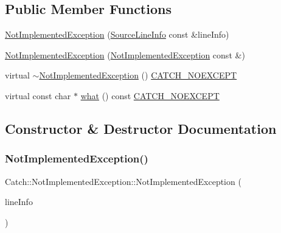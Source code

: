 \subsection*{Public Member Functions}
\begin{DoxyCompactItemize}
\item 
\hyperlink{class_catch_1_1_not_implemented_exception_ab4f0a5c39d8ffb72c664e2c07e180634}{Not\+Implemented\+Exception} (\hyperlink{struct_catch_1_1_source_line_info}{Source\+Line\+Info} const \&line\+Info)
\item 
\hyperlink{class_catch_1_1_not_implemented_exception_a508a7a833455da2d3c10ea1a9d45e982}{Not\+Implemented\+Exception} (\hyperlink{class_catch_1_1_not_implemented_exception}{Not\+Implemented\+Exception} const \&)
\item 
virtual \hyperlink{class_catch_1_1_not_implemented_exception_a557e7312aaa32c37bded019f2b059bcb}{$\sim$\+Not\+Implemented\+Exception} () \hyperlink{catch_8hpp_a0408e94ca73880d41f38852b68eadb3c}{C\+A\+T\+C\+H\+\_\+\+N\+O\+E\+X\+C\+E\+PT}
\item 
virtual const char $\ast$ \hyperlink{class_catch_1_1_not_implemented_exception_ad4c13963f1a8feacda0cd331adda89e3}{what} () const \hyperlink{catch_8hpp_a0408e94ca73880d41f38852b68eadb3c}{C\+A\+T\+C\+H\+\_\+\+N\+O\+E\+X\+C\+E\+PT}
\end{DoxyCompactItemize}


\subsection{Constructor \& Destructor Documentation}
\hypertarget{class_catch_1_1_not_implemented_exception_ab4f0a5c39d8ffb72c664e2c07e180634}{}\label{class_catch_1_1_not_implemented_exception_ab4f0a5c39d8ffb72c664e2c07e180634} 
\subsubsection{\texorpdfstring{Not\+Implemented\+Exception()}{NotImplementedException()}\hspace{0.1cm}{\footnotesize\ttfamily [1/2]}}
{\footnotesize\ttfamily Catch\+::\+Not\+Implemented\+Exception\+::\+Not\+Implemented\+Exception (\begin{DoxyParamCaption}\item[{\hyperlink{struct_catch_1_1_source_line_info}{Source\+Line\+Info} const \&}]{line\+Info }\end{DoxyParamCaption})}

